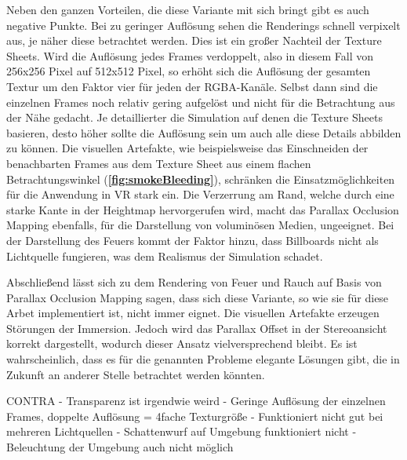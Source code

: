 Neben den ganzen Vorteilen, die diese Variante mit sich bringt gibt es auch negative Punkte. Bei zu geringer Auflösung sehen die Renderings schnell
verpixelt aus, je näher diese betrachtet werden. Dies ist ein großer Nachteil der Texture Sheets. Wird die Auflösung jedes Frames verdoppelt, also in diesem
Fall von 256x256 Pixel auf 512x512 Pixel, so erhöht sich die Auflösung der gesamten Textur um den Faktor vier für jeden der RGBA-Kanäle. Selbst dann sind
die einzelnen Frames noch relativ gering aufgelöst und nicht für die Betrachtung aus der Nähe gedacht. Je detaillierter die Simulation auf denen die Texture Sheets basieren,
desto höher sollte die Auflösung sein um auch alle diese Details abbilden zu können.
Die visuellen Artefakte, wie beispielsweise das Einschneiden der benachbarten Frames aus dem Texture Sheet aus einem flachen Betrachtungswinkel (\textbf{\autoref{fig:smokeBleeding}}),
schränken die Einsatzmöglichkeiten für die Anwendung in VR stark ein. Die Verzerrung am Rand, welche durch eine starke Kante in der Heightmap hervorgerufen wird, macht das
Parallax Occlusion Mapping ebenfalls, für die Darstellung von voluminösen Medien, ungeeignet. 
Bei der Darstellung des Feuers kommt der Faktor hinzu, dass Billboards nicht als Lichtquelle fungieren, was dem Realismus der Simulation schadet.

Abschließend lässt sich zu dem Rendering von Feuer und Rauch auf Basis von Parallax Occlusion Mapping sagen, dass sich diese Variante, so wie sie für diese Arbet
implementiert ist, nicht immer eignet. Die visuellen Artefakte erzeugen Störungen der Immersion. Jedoch wird das Parallax Offset in der Stereoansicht korrekt dargestellt,
wodurch dieser Ansatz vielversprechend bleibt. Es ist wahrscheinlich, dass es für die genannten Probleme elegante Lösungen gibt, die in Zukunft an anderer Stelle 
betrachtet werden könnten.



CONTRA\newline
- Transparenz ist irgendwie weird\newline
- Geringe Auflösung der einzelnen Frames, doppelte Auflösung = 4fache Texturgröße \newline
- Funktioniert nicht gut bei mehreren Lichtquellen\newline
- Schattenwurf auf Umgebung funktioniert nicht\newline
- Beleuchtung der  Umgebung auch nicht möglich\newline

